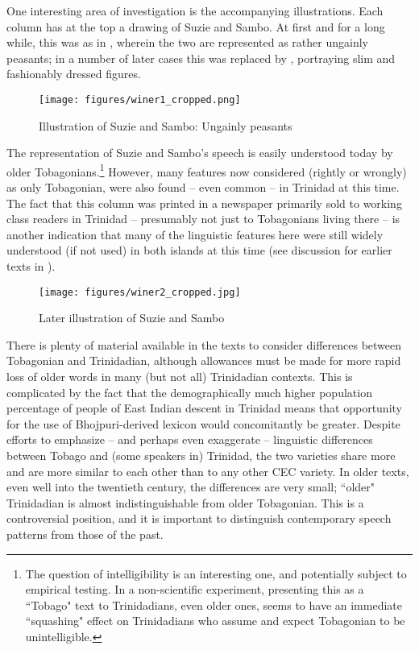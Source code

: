 \documentclass[output=paper,colorlinks,citecolor=brown]{langscibook}
\begin{document}
One interesting area of investigation is the accompanying illustrations.  Each column has at the top a drawing of Suzie and Sambo.  At first and for a long while, this was as in , wherein the two are represented as rather ungainly peasants; in a number of later cases this was replaced by , portraying slim and fashionably dressed figures.

 
\begin{figure}
\texttt{[image: figures/winer1\_cropped.png]}
\caption{Illustration of Suzie and Sambo: Ungainly peasants\label{fig:winer:1}}
\end{figure}
 
\largerpage
\begin{sloppypar}
The representation of Suzie and Sambo’s speech is easily understood today by older Tobagonians.\footnote{The question of intelligibility is an interesting one, and potentially subject to empirical testing.  In a non-scientific experiment, presenting this as a ``Tobago" text to Trinidadians, even older ones, seems to have an immediate ``squashing" effect on Trinidadians who assume and expect Tobagonian to be unintelligible.} However, many features now considered (rightly or wrongly) as only Tobagonian, were also found – even common – in Trinidad at this time.  The fact that this column was printed in a newspaper primarily sold to working class readers in Trinidad – presumably not just to Tobagonians living there – is another indication that many of the linguistic features here were still widely understood (if not used) in both islands at this time (see discussion for earlier texts in \citealt{winer1995penny}).
\end{sloppypar}  



\begin{figure}
\texttt{[image: figures/winer2\_cropped.jpg]}
\caption{Later illustration of Suzie and Sambo\label{fig:winer:2}}
\end{figure}

\largerpage
There is plenty of material available in the texts to consider differences between Tobagonian and Trinidadian, although allowances must be made for more rapid loss of older words in many (but not all) Trinidadian contexts.  This is complicated by the fact that the demographically much higher population percentage of people of East Indian descent in Trinidad means that opportunity for the use of Bhojpuri-derived lexicon would concomitantly be greater.  Despite efforts to emphasize – and perhaps even exaggerate – linguistic differences between Tobago and (some speakers in) Trinidad, the two varieties share more and are more similar to each other than to any other CEC variety. In older texts, even well into the twentieth century, the differences are very small; ``older" Trinidadian is almost indistinguishable from older Tobagonian.  This is a controversial position, and it is important to distinguish contemporary speech patterns from those of the past.
\end{document}
